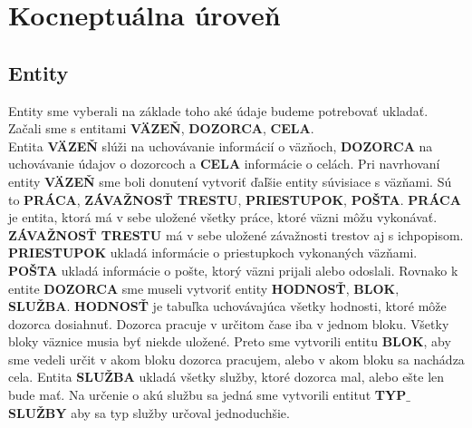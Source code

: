 \documentclass[slovak, 12pt, Times New Roman]{article}
\begin{document}
	\section{Kocneptuálna úroveň}
		\subsection{Entity}
			Entity sme vyberali na základe toho aké údaje budeme potrebovať ukladať. Začali sme s entitami \textbf{VÄZEŇ}, \textbf{DOZORCA}, \textbf{CELA}.\\ Entita \textbf{VÄZEŇ} slúži na uchovávanie informácií o väzňoch, \textbf{DOZORCA} na uchovávanie údajov o dozorcoch a \textbf{CELA} informácie o celách. Pri navrhovaní entity \textbf{VÄZEŇ} sme boli donutení vytvoriť ďaľšie entity súvisiace s väzňami. Sú to \textbf{PRÁCA}, \textbf{ZÁVAŽNOSŤ TRESTU}, \textbf{PRIESTUPOK}, \textbf{POŠTA}. \textbf{PRÁCA} je entita, ktorá má v sebe uložené všetky práce, ktoré väzni môžu vykonávať. \textbf{ZÁVAŽNOSŤ TRESTU} má v sebe uložené závažnosti trestov aj s ichpopisom. \textbf{PRIESTUPOK} ukladá informácie o priestupkoch vykonaných väzňami. \textbf{POŠTA} ukladá informácie o pošte, ktorý väzni prijali alebo odoslali. Rovnako k entite \textbf{DOZORCA} sme museli vytvoriť entity \textbf{HODNOSŤ}, \textbf{BLOK}, \textbf{SLUŽBA}. \textbf{HODNOSŤ} je tabuľka uchovávajúca všetky hodnosti, ktoré môže dozorca dosiahnuť. Dozorca pracuje v určitom čase iba v jednom bloku. Všetky bloky väznice musia byť niekde uložené. Preto sme vytvorili entitu \textbf{BLOK}, aby sme vedeli určit v akom bloku dozorca pracujem, alebo v akom bloku sa nachádza cela. Entita \textbf{SLUŽBA} ukladá všetky služby, ktoré dozorca mal, alebo ešte len bude mať. Na určenie o akú službu sa jedná sme vytvorili entitut \textbf{TYP$\_$SLUŽBY} aby sa typ služby určoval jednoduchšie.
\end{document}
